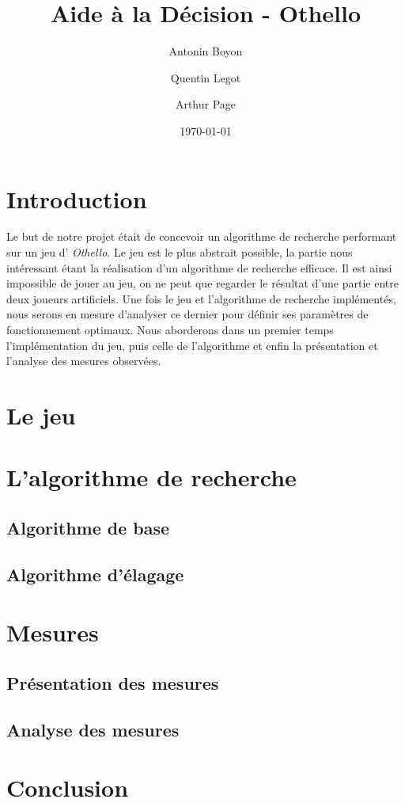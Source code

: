\documentclass[12pt]{article}
\title{Aide à la Décision - Othello}
\author{Antonin Boyon \and Quentin Legot \and Arthur Page}
\date{\today}
\begin{document}
\maketitle
\thispagestyle{empty}
\setcounter{page}{0}
\newpage

\tableofcontents
\newpage

\section{Introduction}
Le but de notre projet était de concevoir un algorithme de recherche performant sur un jeu d' \textit{Othello}. Le jeu est le plus abstrait possible, la partie nous intéressant étant la réalisation d'un algorithme de recherche efficace. Il est ainsi impossible de jouer au jeu, on ne peut que regarder le résultat d'une partie entre deux joueurs artificiels.
Une fois le jeu et l'algorithme de recherche implémentés, nous serons en mesure d'analyser ce dernier pour définir ses paramètres de fonctionnement optimaux. Nous aborderons dans un premier temps l'implémentation du jeu, puis celle de l'algorithme et enfin la présentation et l'analyse des mesures observées.

\section{Le jeu}


\section{L'algorithme de recherche}
\subsection{Algorithme de base}
\subsection{Algorithme d'élagage}

\section{Mesures}
\subsection{Présentation des mesures}
\subsection{Analyse des mesures}

\section{Conclusion}
\end{document}
